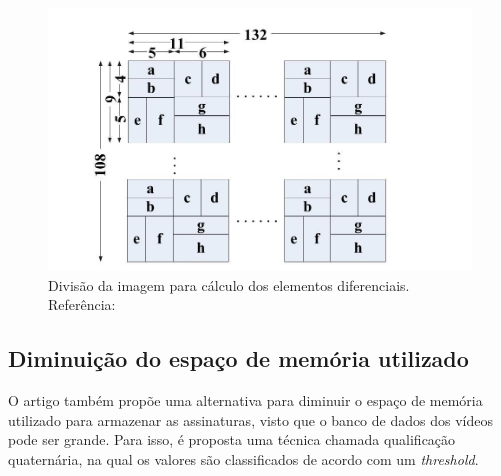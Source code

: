 \begin{figure}[h]
	\centering
    \label{fig:divsceneframe}
	\includegraphics[width=\textwidth]{dados/figuras/divisaosceneframe.jpg}
    \caption{Divisão da imagem para cálculo dos elementos diferenciais. Referência: \cite{mao2015sceneframe}}
\end{figure}

\subsection{Diminuição do espaço de memória utilizado}

O artigo também propõe uma alternativa para diminuir o espaço de memória utilizado para armazenar as assinaturas, visto que o banco de dados dos vídeos pode ser grande. Para isso, é proposta uma técnica chamada qualificação quaternária, na qual os valores são classificados de acordo com um \textit{threshold}.



